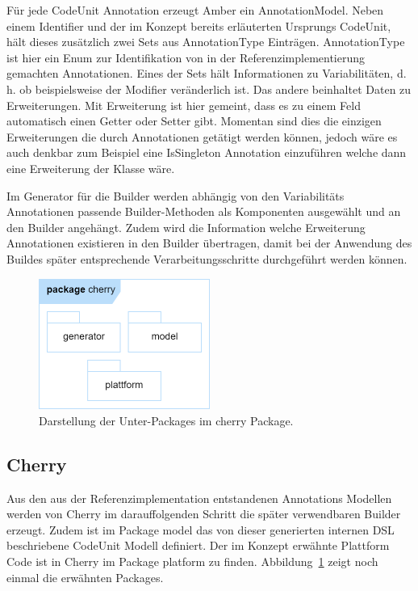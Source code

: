 \documentclass[12pt,oneside,a4paper,parskip]{scrbook}
\begin{document}
Für jede CodeUnit Annotation erzeugt Amber ein AnnotationModel. Neben einem Identifier und der im Konzept bereits erläuterten Ursprungs CodeUnit, hält dieses zusätzlich zwei Sets aus AnnotationType Einträgen. AnnotationType ist hier ein Enum zur Identifikation von in der Referenzimplementierung gemachten Annotationen. Eines der Sets hält Informationen zu Variabilitäten, d. h. ob beispielsweise der Modifier veränderlich ist. Das andere beinhaltet Daten zu Erweiterungen. Mit Erweiterung ist hier gemeint, dass es zu einem Feld automatisch einen Getter oder Setter gibt. Momentan sind dies die einzigen Erweiterungen die durch Annotationen getätigt werden können, jedoch wäre es auch denkbar zum Beispiel eine IsSingleton Annotation einzuführen welche dann eine Erweiterung der Klasse wäre.

Im Generator für die Builder werden abhängig von den Variabilitäts Annotationen passende Builder-Methoden als Komponenten ausgewählt und an den Builder angehängt. Zudem wird die Information welche Erweiterung Annotationen existieren in den Builder übertragen, damit bei der Anwendung des Buildes später entsprechende Verarbeitungsschritte durchgeführt werden können.

\begin{figure}[htbp]
	\centering
	\includegraphics[width=0.5\textwidth]{bilder/cherry}
	\caption{Darstellung der Unter-Packages im cherry Package.}
	\label{fig:cherryPackages}
\end{figure}

\subsection{Cherry}

Aus den aus der Referenzimplementation entstandenen Annotations Modellen werden von Cherry im darauffolgenden Schritt die später verwendbaren Builder erzeugt. Zudem ist im Package model das von dieser generierten internen DSL beschriebene CodeUnit Modell definiert. Der im Konzept erwähnte Plattform Code ist in Cherry im Package platform zu finden. Abbildung~\ref{fig:cherryPackages} zeigt noch einmal die erwähnten Packages.
\end{document}
